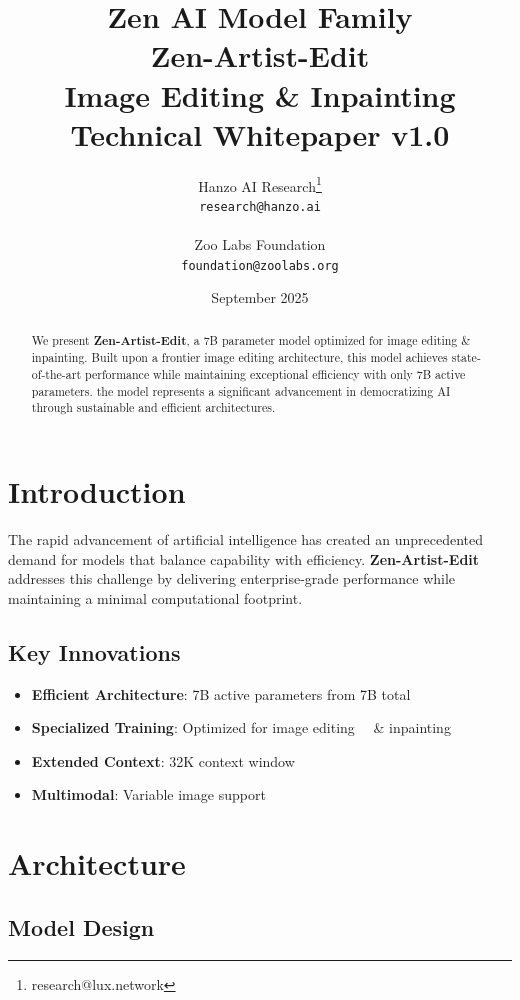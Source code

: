 \documentclass[11pt,a4paper]{article}
\title{
    \vspace{-2cm}
    \Large \textbf{Zen AI Model Family} \\
    \vspace{0.5cm}
    \Huge \textbf{Zen-Artist-Edit} \\
    \vspace{0.3cm}
    \large Image Editing \&     Inpainting \\
    \vspace{0.5cm}
    \normalsize Technical Whitepaper v1.0
}
\author{
    Hanzo AI Research\thanks{research@lux.network} \\
    \texttt{research@hanzo.ai} \\
    \\
    Zoo Labs Foundation \\
    \texttt{foundation@zoolabs.org}
}
\date{September 2025}
\begin{document}
\maketitle

\begin{abstract}
We present \textbf{Zen-Artist-Edit}, a 7B parameter model optimized for image editing \&     inpainting. 
Built upon a frontier image editing architecture, this model achieves state-of-the-art performance while maintaining exceptional efficiency 
with only 7B active parameters. the model represents a significant advancement in democratizing AI through sustainable and efficient architectures.
\end{abstract}

\tableofcontents
\newpage

\section{Introduction}

The rapid advancement of artificial intelligence has created an unprecedented demand for models that balance capability with efficiency. 
\textbf{Zen-Artist-Edit} addresses this challenge by delivering enterprise-grade performance while maintaining a minimal computational footprint.

\subsection{Key Innovations}
\begin{itemize}
    \item \textbf{Efficient Architecture}: 7B active parameters from 7B total
    \item \textbf{Specialized Training}: Optimized for image editing \ \ \&   inpainting
    \item \textbf{Extended Context}: 32K context window
    
    \item \textbf{Multimodal}: Variable image support
    
\end{itemize}

\section{Architecture}

\subsection{Model Design}
\end{document}
